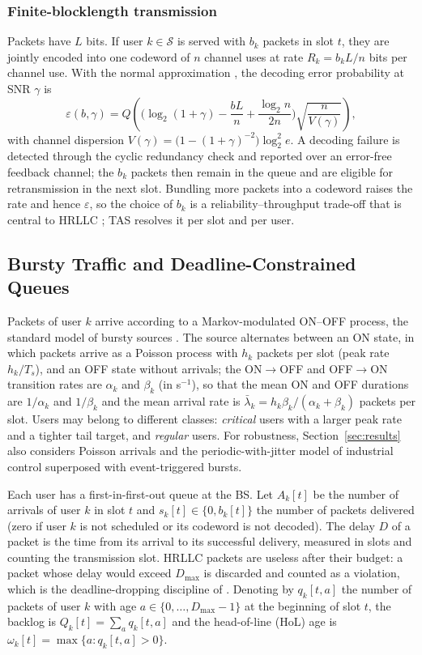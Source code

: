 \documentclass[journal]{IEEEtran}
\newcommand{\Dmax}{D_{\max}}
\newcommand{\Sset}{\mathcal{S}}
\begin{document}
\subsubsection{Finite-blocklength transmission} Packets have $L$ bits. If user $k\in\Sset$ is served with $b_k$ packets in slot $t$, they are jointly encoded into one codeword of $n$ channel uses at rate $R_k=b_kL/n$ bits per channel use. With the normal approximation \cite{Polyanskiy2010}, the decoding error probability at SNR $\gamma$ is
\begin{equation}\label{eq:fbl}
\varepsilon(b,\gamma)=Q\!\left(\Big(\log_2(1+\gamma)-\frac{bL}{n}+\frac{\log_2 n}{2n}\Big)\sqrt{\frac{n}{V(\gamma)}}\right),
\end{equation}
with channel dispersion $V(\gamma)=\big(1-(1+\gamma)^{-2}\big)\log_2^2 e$. A decoding failure is detected through the cyclic redundancy check and reported over an error-free feedback channel; the $b_k$ packets then remain in the queue and are eligible for retransmission in the next slot. Bundling more packets into a codeword raises the rate and hence $\varepsilon$, so the choice of $b_k$ is a reliability--throughput trade-off that is central to HRLLC \cite{Zhao2022QueueAware,Li2024RLR}; TAS resolves it per slot and per user.

\subsection{Bursty Traffic and Deadline-Constrained Queues}
Packets of user $k$ arrive according to a Markov-modulated ON--OFF process, the standard model of bursty sources \cite{Anick1982,Elwalid1993,Ozmen2016}. The source alternates between an ON state, in which packets arrive as a Poisson process with $h_k$ packets per slot (peak rate $h_k/T_s$), and an OFF state without arrivals; the ON$\to$OFF and OFF$\to$ON transition rates are $\alpha_k$ and $\beta_k$ (in s$^{-1}$), so that the mean ON and OFF durations are $1/\alpha_k$ and $1/\beta_k$ and the mean arrival rate is $\bar\lambda_k=h_k\beta_k/(\alpha_k+\beta_k)$ packets per slot. Users may belong to different classes: \emph{critical} users with a larger peak rate and a tighter tail target, and \emph{regular} users. For robustness, Section~\ref{sec:results} also considers Poisson arrivals and the periodic-with-jitter model of industrial control \cite{3GPP-TS22104} superposed with event-triggered bursts.

Each user has a first-in-first-out queue at the BS. Let $A_k[t]$ be the number of arrivals of user $k$ in slot $t$ and $s_k[t]\in\{0,b_k[t]\}$ the number of packets delivered (zero if user $k$ is not scheduled or its codeword is not decoded). The delay $D$ of a packet is the time from its arrival to its successful delivery, measured in slots and counting the transmission slot. HRLLC packets are useless after their budget: a packet whose delay would exceed $\Dmax$ is discarded and counted as a violation, which is the deadline-dropping discipline of \cite{Zhang2025HRL}. Denoting by $q_k[t,a]$ the number of packets of user $k$ with age $a\in\{0,\dots,\Dmax-1\}$ at the beginning of slot $t$, the backlog is $Q_k[t]=\sum_a q_k[t,a]$ and the head-of-line (HoL) age is $\omega_k[t]=\max\{a: q_k[t,a]>0\}$.
\end{document}
